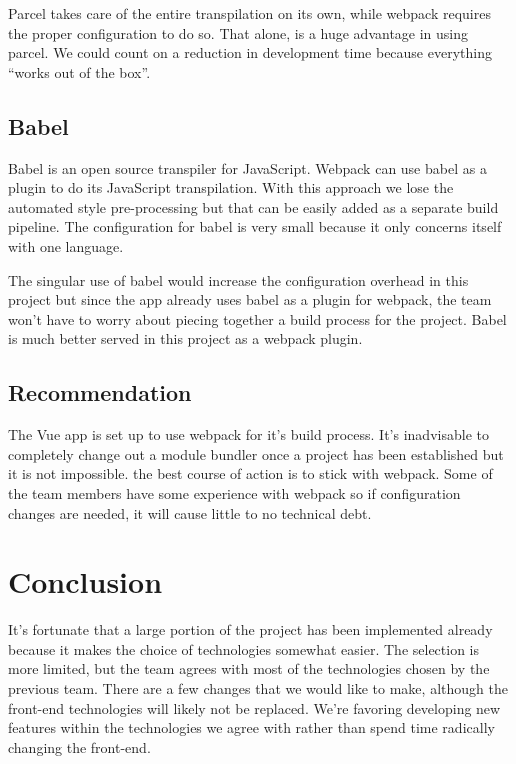 \documentclass[draftclsnofoot,onecolumn,journal,letterpaper,compsoc,10pt]{IEEEtran}
\begin{document}
        Parcel takes care of the entire transpilation on its own, while webpack requires the proper configuration to do so. That alone, is a huge advantage in using parcel. We could count on a reduction in development time because everything “works out of the box”. 

        \subsection{Babel}
        Babel is an open source transpiler for JavaScript. Webpack can use babel as a plugin to do its JavaScript transpilation. With this approach we lose the automated style pre-processing but that can be easily added as a separate build pipeline. The configuration for babel is very small because it only concerns itself with one language.
        
        The singular use of babel would increase the configuration overhead in this project but since the app already uses babel as a plugin for webpack, the team won’t have to worry about piecing together a build process for the project. Babel is much better served in this project as a webpack plugin.
        
        \subsection{Recommendation}
        The Vue app is set up to use webpack for it's build process. It's inadvisable to completely change out a module bundler once a project has been established but it is not impossible. the best course of action is to stick with webpack. Some of the team members have some experience with webpack so if configuration changes are needed, it will cause little to no technical debt.
    
    \section{Conclusion}
    It's fortunate that a large portion of the project has been implemented already because it makes the choice of technologies somewhat easier. The selection is more limited, but the team agrees with most of the technologies chosen by the previous team. There are a few changes that we would like to make, although the front-end technologies will likely not be replaced. We're favoring developing new features within the technologies we agree with rather than spend time radically changing the front-end. \\
        
\nocite{*}%


\end{document}
